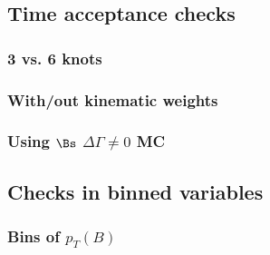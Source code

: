 \subsection{Time acceptance checks} %



\begin{frame} %
\frametitle{3 vs. 6 knots}

\tiny


\end{frame} %



\begin{frame} %
\frametitle{With/out kinematic weights}

\tiny


\end{frame} %



\begin{frame} %
\frametitle{Using $\Bs$ $\Delta\Gamma \neq 0$ MC}

\tiny


\end{frame} %



\subsection{Checks in binned variables} %



\begin{frame} %
\frametitle{Bins of $p_T(B)$}

\tiny


\end{frame} %



